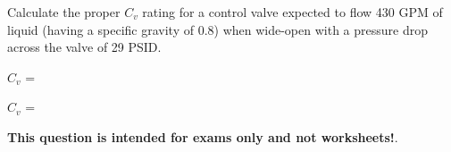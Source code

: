 

Calculate the proper $C_v$ rating for a control valve expected to flow 430 GPM of liquid (having a specific gravity of 0.8) when wide-open with a pressure drop across the valve of 29 PSID.

\vskip 10pt

$C_v$ = \underbar{\hskip 50pt}







$C_v$ = 







{\bf This question is intended for exams only and not worksheets!}.



